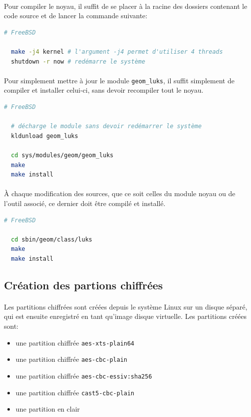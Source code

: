 \paragraph{}
Pour compiler le noyau, il suffit de se placer à la racine des dossiers
contenant le code source et de lancer la commande suivante:
\\
\begin{lstlisting}[language=bash]
  # FreeBSD

  make -j4 kernel # l'argument -j4 permet d'utiliser 4 threads 
  shutdown -r now # redémarre le système
\end{lstlisting}
\paragraph{}
Pour simplement mettre à jour le module \texttt{geom\_luks}, il suffit
simplement de compiler et installer celui-ci, sans devoir recompiler tout le
noyau.
\\
\begin{lstlisting}[language=bash]
  # FreeBSD

  # décharge le module sans devoir redémarrer le système
  kldunload geom_luks

  cd sys/modules/geom/geom_luks
  make
  make install
\end{lstlisting}
\paragraph{}
À chaque modification des sources, que ce soit celles du module noyau ou de
l'outil associé, ce dernier doit être compilé et installé.
\\
\begin{lstlisting}[language=bash]
  # FreeBSD

  cd sbin/geom/class/luks
  make
  make install
\end{lstlisting}


\subsection{Création des partions chiffrées}
\paragraph{}
Les partitions chiffrées sont créées depuis le système Linux sur un disque
séparé, qui est ensuite enregistré en tant qu'image disque virtuelle. Les
partitions créées sont:
\begin{itemize}
\item une partition chiffrée \texttt{aes-xts-plain64}
\item une partition chiffrée \texttt{aes-cbc-plain}
\item une partition chiffrée \texttt{aes-cbc-essiv:sha256}
\item une partition chiffrée \texttt{cast5-cbc-plain}
\item une partition en clair
\end{itemize}
